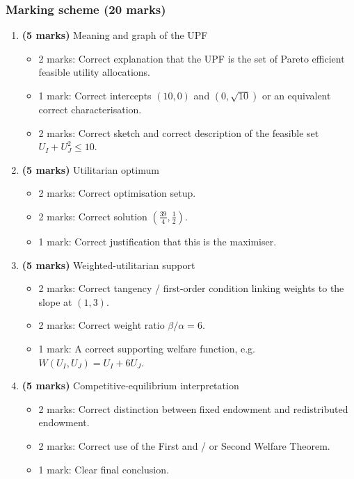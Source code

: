 \documentclass[12pt]{article}
\begin{document}
\newpage
\subsubsection{Marking scheme (20 marks)}

\begin{enumerate}[label=(\alph*)]
    \item \textbf{(5 marks)} Meaning and graph of the UPF
    \begin{itemize}[leftmargin=*]
        \item 2 marks: Correct explanation that the UPF is the set of Pareto efficient feasible utility allocations.
        \item 1 mark: Correct intercepts \((10,0)\) and \((0,\sqrt{10})\) or an equivalent correct characterisation.
        \item 2 marks: Correct sketch and correct description of the feasible set \(U_I+U_J^2\le 10\).
    \end{itemize}

    \item \textbf{(5 marks)} Utilitarian optimum
    \begin{itemize}[leftmargin=*]
        \item 2 marks: Correct optimisation setup.
        \item 2 marks: Correct solution \(\left(\frac{39}{4},\frac12\right)\).
        \item 1 mark: Correct justification that this is the maximiser.
    \end{itemize}

    \item \textbf{(5 marks)} Weighted-utilitarian support
    \begin{itemize}[leftmargin=*]
        \item 2 marks: Correct tangency / first-order condition linking weights to the slope at \((1,3)\).
        \item 2 marks: Correct weight ratio \(\beta/\alpha = 6\).
        \item 1 mark: A correct supporting welfare function, e.g. \(W(U_I,U_J)=U_I+6U_J\).
    \end{itemize}

    \item \textbf{(5 marks)} Competitive-equilibrium interpretation
    \begin{itemize}[leftmargin=*]
        \item 2 marks: Correct distinction between fixed endowment and redistributed endowment.
        \item 2 marks: Correct use of the First and / or Second Welfare Theorem.
        \item 1 mark: Clear final conclusion.
    \end{itemize}
\end{enumerate}
\end{document}
